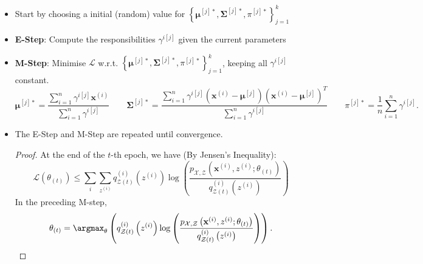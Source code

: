 \begin{itemize}
  \item Start by choosing a initial (random) value for
    ${\left\{\mathbf{\mu}^{[j]*},\mathbf{\Sigma}^{[j]*},\pi^{[j]*}\right\}}_{j=1}^{k}$
  \item \textbf{E-Step}: Compute the responsibilities $\gamma^{i[j]}$ given the
    current parameters
  \item \textbf{M-Step}: Minimise $\mathcal{L}$ w.r.t.
    ${\left\{\mathbf{\mu}^{[j]*},\mathbf{\Sigma}^{[j]*},\pi^{[j]*}\right\}}_{j=1}^{k}$,
    keeping all $\gamma^{i[j]}$ constant.
\[\mathbf{\mu}^{[j]*}=\frac{\sum_{i=1}^{n} \gamma^{i[j]}\mathbf{x}^{(i)}}{\sum_{i=1}^{n} \gamma^{i[j]}}\qquad
\mathbf{\Sigma}^{[j]*}=\frac{\sum_{i=1}^{n} \gamma^{i[j]}{\left(\mathbf{x}^{(i)}-\mathbf{\mu}^{[j]}\right)} {\left(\mathbf{x}^{(i)}-\mathbf{\mu}^{[j]}\right)}^{T}}{\sum_{i=1}^{n} \gamma^{i[j]}}\qquad
\pi^{[j]*}=\frac{1}{n}\sum_{i=1}^{n} \gamma^{i[j]}.\] 
  \item The E-Step and M-Step are repeated until convergence.\\
    \begin{proof}
      At the end of the $t$-th epoch, we have (By Jensen's Inequality):
      \[\mathcal{L}\left( \theta_{(t)} \right) \le \sum_{i} \sum_{z^{(i)}} q_{\mathcal{Z}(t)}^{(i)}\left( z^{(i)} \right) \log\left( \frac{p_{\mathcal{X},\mathcal{Z}}\left( \mathbf{x}^{(i)},z^{(i)};\theta_{(t)} \right)}{q^{(i)}_{\mathcal{Z}(t)}\left( z^{(i)} \right) } \right) \]
      In the preceding M-step,
      \[\theta_{(t)}=\argmax_\theta\left(  q_{\mathcal{Z}(t)}^{(i)}\left( z^{(i)} \right) \log\left( \frac{p_{\mathcal{X},\mathcal{Z}}\left( \mathbf{x}^{(i)},z^{(i)};\theta_{(t)} \right)}{q^{(i)}_{\mathcal{Z}(t)}\left( z^{(i)} \right) } \right)\right).\] 

\end{proof}
\end{itemize}
